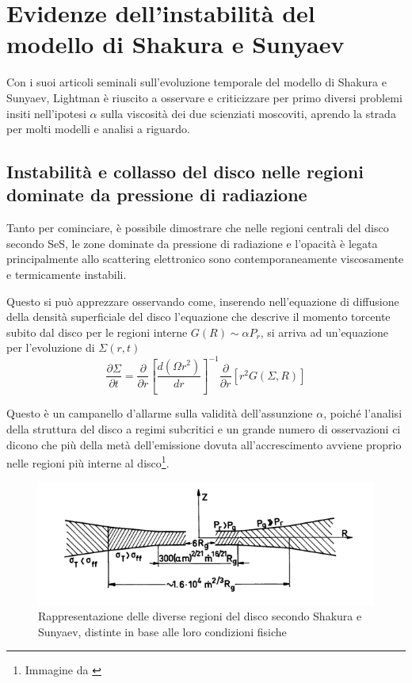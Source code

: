 \documentclass[a4paperbi]{article}
\begin{document}
\newpage
\section{Evidenze dell'instabilità del modello di Shakura e Sunyaev}
	Con i suoi articoli seminali sull'evoluzione temporale del modello di Shakura e Sunyaev, Lightman è riuscito a osservare e criticizzare per primo diversi problemi insiti nell'ipotesi $\alpha$ sulla viscosità dei due scienziati moscoviti, aprendo la strada per molti modelli e analisi a riguardo.
	
	\subsection{Instabilità e collasso del disco nelle regioni dominate da pressione di radiazione}
	Tanto per cominciare, è possibile dimostrare che nelle regioni centrali del disco secondo SeS, le zone dominate da pressione di radiazione e l'opacità è legata principalmente allo scattering elettronico sono contemporaneamente viscosamente e termicamente instabili.
	
	Questo si può apprezzare osservando come, inserendo nell'equazione di diffusione della densità superficiale del disco l'equazione che descrive il momento torcente subito dal disco per le regioni interne $G(R)\sim\alpha P_r$, si arriva ad un'equazione per l'evoluzione di $\Sigma(r,t)$
	\begin{equation*}
		\frac{\partial\Sigma}{\partial t}=\frac{\partial}{\partial r}\left[\frac{d(\Omega r^2)}{dr}\right]^{-1}\frac{\partial}{\partial r}[r^2G(\Sigma,R)]
	\end{equation*}
	
	Questo è un campanello d'allarme sulla validità dell'assunzione $\alpha$, poiché l'analisi della struttura del disco a regimi subcritici e un grande numero di osservazioni ci dicono che più della metà dell'emissione dovuta all'accrescimento avviene proprio nelle regioni più interne al disco\footnote{Immagine da \cite{ShakuraSunyaev1973}}.
		
	\begin{figure}[H]
		\centering
		\includegraphics[width=0.9\linewidth]{RegioniDisco}
		\caption{Rappresentazione delle diverse regioni del disco secondo Shakura e Sunyaev, distinte in base alle loro condizioni fisiche}
		\label{fig:RegioniDisco}
	\end{figure}	
	
\end{document}
